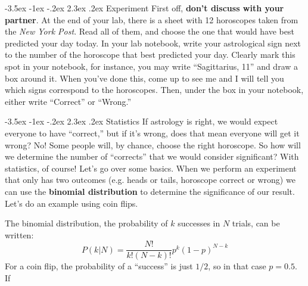 \documentclass[12pt]{article}
\makeatletter
\renewcommand\section{\@startsection{section}{1}{\z@}%
                                  {-3.5ex \@plus -1ex \@minus -.2ex}%
                                  {2.3ex \@plus.2ex}%
                                  {\normalfont\large\bfseries}}
\makeatother
\begin{document}
\section{Experiment}
First off, \textbf{don't discuss with your partner}. At the end of your lab, there is a sheet with 12 horoscopes taken from the \emph{New York Post}. Read all of them, and choose the one that would have best predicted your day today. In your lab notebook, write your astrological sign next to the number of the horoscope that best predicted your day. Clearly mark this spot in your notebook, for instance, you may write ``Sagittarius, 11'' and draw a box around it. When you've done this, come up to see me and I will tell you which signs correspond to the horoscopes. Then, under the box in your notebook, either write ``Correct'' or ``Wrong.'' 

\section{Statistics}
If astrology is right, we would expect everyone to have ``correct,'' but if it's wrong, does that mean everyone will get it wrong? No! Some people will, by chance, choose the right horoscope. So how will we determine the number of ``corrects'' that we would consider significant? With statistics, of course! Let's go over some basics. When we perform an experiment that only has two outcomes (e.g. heads or tails, horoscope correct or wrong) we can use the \textbf{binomial distribution} to determine the significance of our result. Let's do an example using coin flips. 

The binomial distribution, the probability of $k$ successes in $N$ trials, can be written:
\begin{equation}
	P(k|N) = \frac{N!}{k!(N-k)!} p^{k}(1-p)^{N-k}
\end{equation}
For a coin flip, the probability of a ``success'' is just $1/2$, so in that case $p=0.5$. If
\end{document}

